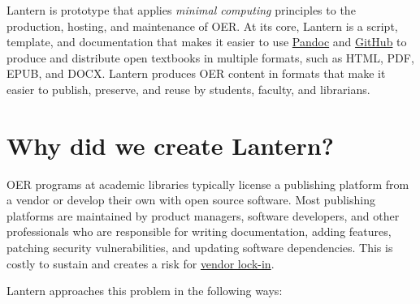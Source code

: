 \documentclass[
  11pt,
  openany]{book}
\begin{document}
Lantern is prototype that applies \emph{minimal computing} principles to the
production, hosting, and maintenance of OER. At its core, Lantern is a script,
template, and documentation that makes it easier to use
\href{http://pandoc.org/}{Pandoc} and \href{https://github.com/}{GitHub} to
produce and distribute open textbooks in multiple formats, such as HTML, PDF,
EPUB, and DOCX. Lantern produces OER content in formats that make it easier to
publish, preserve, and reuse by students, faculty, and librarians.

\hypertarget{why-did-we-create-lantern}{%
\section{Why did we create Lantern?}\label{why-did-we-create-lantern}}

OER programs at academic libraries typically license a publishing platform
from a vendor or develop their own with open source software. Most publishing
platforms are maintained by product managers, software developers, and other
professionals who are responsible for writing documentation, adding features,
patching security vulnerabilities, and updating software dependencies. This is
costly to sustain and creates a risk for
\href{https://en.wikipedia.org/wiki/Vendor_lock-in}{vendor lock-in}.

Lantern approaches this problem in the following ways:
\end{document}
